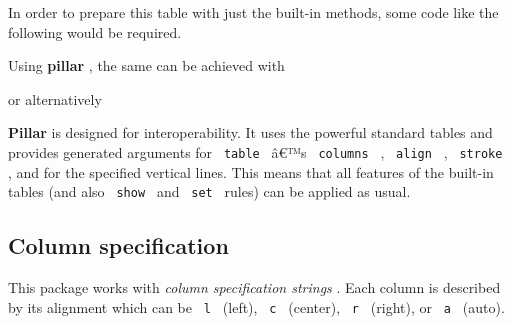 In order to prepare this table with just the built-in methods, some code
like the following would be required.

\begin{Shaded}
\begin{Highlighting}[]


\NormalTok{)}
\end{Highlighting}
\end{Shaded}

Using \textbf{pillar} , the same can be achieved with

\begin{Shaded}
\begin{Highlighting}[]

\NormalTok{)}
\end{Highlighting}
\end{Shaded}

or alternatively

\begin{Shaded}
\begin{Highlighting}[]

\NormalTok{)}
\end{Highlighting}
\end{Shaded}

\textbf{Pillar} is designed for interoperability. It uses the powerful
standard tables and provides generated arguments for \texttt{\ table\ }
â€™s \texttt{\ columns\ } , \texttt{\ align\ } , \texttt{\ stroke\ } ,
and for the specified vertical lines. This means that all features of
the built-in tables (and also \texttt{\ show\ } and \texttt{\ set\ }
rules) can be applied as usual.

\subsection{Column specification}\label{column-specification}

This package works with \emph{column specification strings} . Each
column is described by its alignment which can be \texttt{\ l\ } (left),
\texttt{\ c\ } (center), \texttt{\ r\ } (right), or \texttt{\ a\ }
(auto).

